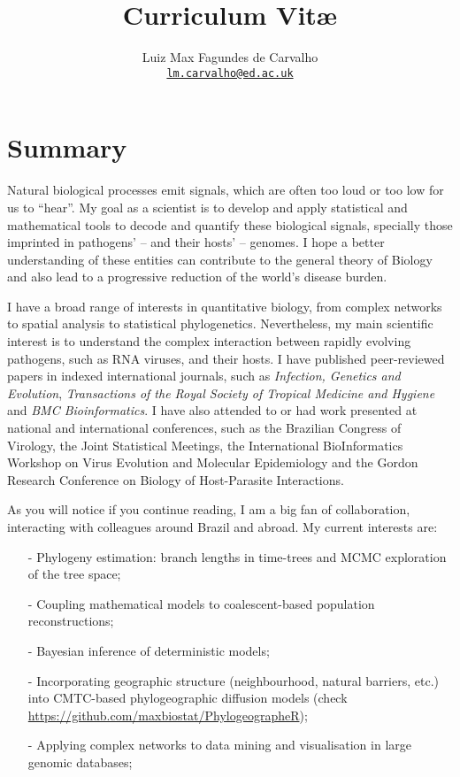 \documentclass[10pt]{article}
\title{\bfseries Curriculum Vit\ae}
\author{Luiz Max Fagundes de Carvalho \\
\href{mailto:lm.carvalho@ed.ac.uk}{\nolinkurl{lm.carvalho@ed.ac.uk}}}
\affil{Rambaut Group, Institute of Evolutionary Biology, School of Biological Sciences, University of Edinburgh, UK.}
\date{}
\begin{document}
\maketitle
\section*{Summary}
Natural biological processes emit signals, which are often too loud or too low for us to ``hear''.
My goal as a scientist is to develop and apply statistical and mathematical tools to decode and quantify these biological signals, specially those imprinted in pathogens' -- and their hosts' -- genomes.
I hope a better understanding of these entities can contribute to the general theory of Biology and also lead to a progressive reduction of the world's disease burden.

I have a broad range of interests in quantitative biology, from complex networks to spatial analysis to statistical phylogenetics.
Nevertheless, my main scientific interest is to understand the complex interaction between rapidly evolving pathogens, such as {RNA} viruses, and their hosts.
I have published peer-reviewed papers in indexed international journals, such as \textit{Infection, Genetics and Evolution}, \textit{Transactions of the Royal Society of Tropical Medicine and Hygiene} and \textit{BMC Bioinformatics}.
I have also attended to or had work presented at national and international conferences, such as the Brazilian Congress of Virology, the Joint Statistical Meetings, the International BioInformatics Workshop on Virus Evolution and Molecular Epidemiology and the Gordon Research Conference on Biology of Host-Parasite Interactions.

As you will notice if you continue reading, I am a big fan of collaboration, interacting with colleagues around Brazil and abroad.
My current interests are:
\begin{itemize}
\itemsep0.1em
 \item [-] Phylogeny estimation: branch lengths in time-trees and MCMC exploration of the tree space;
 \item [-] Coupling mathematical models to coalescent-based population reconstructions;
 \item [-] Bayesian inference of deterministic models;
 \item [-] Incorporating geographic structure (neighbourhood, natural barriers, etc.) into CMTC-based phylogeographic diffusion models (check \url{https://github.com/maxbiostat/PhylogeographeR});
 \item [-] Applying complex networks to data mining and visualisation in large genomic databases; 
\end{itemize}
\end{document}
